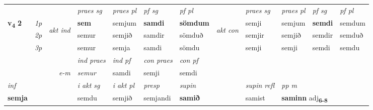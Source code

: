 \begin{longtable}[l]{X>{\footnotesize\itshape}llXXXXlXXXX}
\midrule

 & &   & \textit{praes sg}  & \textit{praes pl}    & \textit{ pf sg} & \textit{pf pl} & & \textit{praes sg}  & \textit{praes pl}    & \textit{pf sg} & \textit{pf pl }  \\ \cmidrule{4-7} \cmidrule{9-12}
 \multirow{2}{*}{{{\textbf{v{\textsubscript{4}}} \Large{\textbf{2}}}}}  & 1p & \multirow{3}{*}{\begin{turn}{90}\textit{akt ind}\end{turn}} & \textbf{sem} & semjum & \textbf{samdi} & \textbf{sömdum} & \multirow{3}{*}{\begin{turn}{90}\textit{akt con}\end{turn}} &semji & semjum & \textbf{semdi} & semdum\\*
 & 2p &  &  semur  & semjið & samdir & sömduð & & semjir & semjið & semdir & semduð \\*
 & 3p &  & semur & semja & samdi & sömdu & & semji & semji& semdi & semdu \\*
\cmidrule{4-7} \cmidrule{9-12}

   && &  \textit{ind praes} & \textit{ind pf} & \textit{con praes} & \textit{con pf} \\*
\multicolumn{3}{r}{\textit{e-m}} & semur & samdi & semji & semdi \\*

\cmidrule{4-7}
   {\textit{inf}} & &  & \textit{i akt sg} & \textit{i akt pl}   & \textit{presp} & \textit{supin} && \textit{supin refl} & \textit{pp m} \\*
  {\textbf{semja}} & && semdu  & semjið   & semjandi &  \textbf{samið} && samist & \multicolumn{2}{l}{\textbf{saminn} adj\textbf{\textsubscript{6-8}}} \\*

\midrule


\end{longtable}
